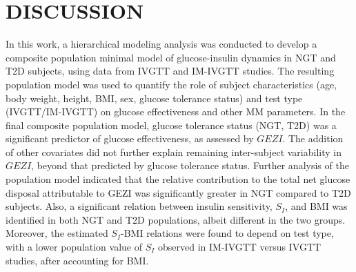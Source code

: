 \documentclass[utf8]{frontiersSCNS} %
\begin{document}
\section{DISCUSSION}
In this work, a hierarchical modeling analysis was conducted to develop a composite population minimal model of glucose-insulin dynamics in NGT and T2D subjects, using data from IVGTT and IM-IVGTT studies. The resulting population model was used to quantify the role of subject characteristics (age, body weight, height, BMI, sex, glucose tolerance status) and test type (IVGTT/IM-IVGTT) on glucose effectiveness and other MM parameters. In the final composite population model, glucose tolerance status (NGT, T2D) was a significant predictor of glucose effectiveness, as assessed by $GEZI$. The addition of other covariates did not further explain remaining inter-subject variability in $GEZI$, beyond that predicted by glucose tolerance status. Further analysis of the population model indicated that the relative contribution to the total net glucose disposal attributable to GEZI was significantly greater in NGT compared to T2D subjects. Also, a significant relation between insulin sensitivity, $S_I$, and BMI was identified in both NGT and T2D populations, albeit different in the two groups. Moreover, the estimated $S_I$-BMI relations were found to depend on test type, with a lower population value of $S_I$ observed in IM-IVGTT versus IVGTT studies, after accounting for BMI. 
\end{document}
